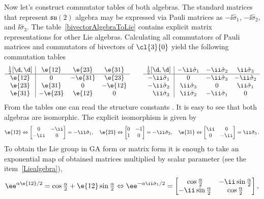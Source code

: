 \begin{example}
Now let's construct commutator tables of both algebras. The
standard matrices that represent $\mathfrak{su}(2)$ algebra may be
expressed via Pauli matrices as $-\ii\hat{\sigma}_1$,
$-\ii\hat{\sigma}_2$, and $\ii\hat{\sigma}_3$. The
table~\ref{bivectorAlgebraToLie} contains explicit matrix
representations for other Lie algebras. Calculating all
commutators of Pauli matrices and commutators of bivectors of
$\cl{3}{0}$ yield the following commutation tables
\[\begin{array}{c|ccc}
\tfrac{1}{2}[\d,\d] &\e{12}&\e{23}&\e{31}\\
\hline
 \e{12}&0 &-\e{31} &\e{23} \\
 \e{23}&\e{31} &0 &-\e{12} \\
 \e{31}&-\e{23}&\e{12} &0
\end{array}\qquad
\begin{array}{c|ccc}
\tfrac{1}{2}[\d,\d] &-\ii\hat{\sigma}_1&-\ii\hat{\sigma}_2&\ii\hat{\sigma}_3\\
\hline
 -\ii\hat{\sigma}_1&0 &-\ii\hat{\sigma}_3 &-\ii\hat{\sigma}_2 \\
 -\ii\hat{\sigma}_2&\ii\hat{\sigma}_3 &0 &\ii\hat{\sigma}_1 \\
\phantom{-}\ii\hat{\sigma}_3&\ii\hat{\sigma}_2&-\ii\hat{\sigma}_1 &0
\end{array}
\]
From the tables one can read the structure constants . It
is easy to see that both algebras are isomorphic. The explicit
isomorphism is given by
\[
\e{12}\Leftrightarrow
\begin{bmatrix}0&-\ii\\-\ii&0\end{bmatrix}=-\ii\hat{\sigma}_1,\quad
\e{23}\Leftrightarrow\begin{bmatrix}0&-1\\1&0\end{bmatrix}=-\ii\hat{\sigma}_2,\quad
\e{31}\Leftrightarrow\begin{bmatrix}\ii&0\\0&-\ii\end{bmatrix}=\ii\hat{\sigma}_3\,.
\]
To obtain the Lie group in GA form or matrix form it is enough to
take an exponential map of obtained matrices multiplied by scalar
parameter (see the item~\ref{Liealgebra}),
\[\begin{split}
&\ee^{\alpha\e{12}/2}=\cos\tfrac{\alpha}{2}+\e{12}\sin\tfrac{\alpha}{2}\Leftrightarrow\ee^{-\alpha\ii\hat{\sigma}_1/2}=
\begin{bmatrix}\cos\tfrac{\alpha}{2}&-\ii\sin\tfrac{\alpha}{2}\\-\ii\sin\tfrac{\alpha}{2}&\cos\tfrac{\alpha}{2}\end{bmatrix},\\

\end{split}\]
\end{example}
